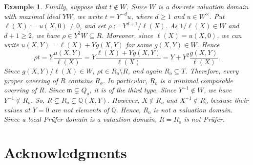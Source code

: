 \documentclass[12pt]{article}
\newtheorem{example}{Example}
\begin{document}
\begin{example}
	Finally, suppose that $t\notin W$. Since $W$ is a discrete valuation domain with maximal ideal $YW$, we write $t=Y^{-d}u$, where $ d\geq1 $ and $ u\in W^\times.$ Put $\ell(X) :=u(X,0)\neq0$, and set $\rho:=Y^{d+1}/\ell(X).$ As $1/\ell(X)\in W$ and $d+1\geq2$, we have $\rho\in Y^2W\subseteq R$. Moreover, since $\ell(X)=u(X,0)$, we can write $u(X,Y)=\ell(X)+Yg(X,Y)$ for some $g(X,Y)\in W$. Hence
	\[	\rho t	=Y\frac{u(X,Y)}{\ell(X)} =Y\frac{\ell(X)+Yg(X,Y)}{\ell(X)}	=Y+Y^2\frac{g(X,Y)}{\ell(X)}.	\]
	Since $g(X,Y)/\ell(X)\in W$, $\rho t\in R_o\setminus R$, and again $R_o\subseteq T$. Therefore, every proper overring of $R$ contains $R_o$. In particular, $R_o$ is a minimal comparable overring of $R$. Since $\mathfrak m\subsetneq Q_o$, it is of the third type. Since $Y^{-1}\notin W$, we have $Y^{-1}\notin R_o$. So, $R\subsetneq R_o\subsetneq\mathbb Q(X,Y).$ However, $X\notin R_o$ and $X^{-1}\notin R_o$ because their values at $Y=0$ are not elements of $\mathbb Q$. Hence, $R_o$ is not a valuation domain. Since a local Prüfer domain is a valuation domain, $\overline{R}=R_o$ is not Prüfer.
\end{example}
\section*{Acknowledgments}
\end{document}
